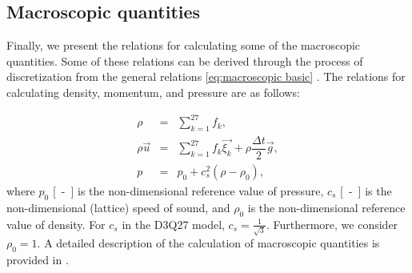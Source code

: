 \subsection{Macroscopic quantities}\label{macro}
Finally, we present the relations for calculating some of the macroscopic quantities. Some of these relations can be derived through the process of discretization from the general relations \eqref{eq:macroscopic basic} \cite{Kruger}. The relations for calculating density, momentum, and pressure are as follows:

\begin{subequations}\label{macroeq}
	\begin{eqnarray}
		\label{rho}
		\rho &=& \sum_{k=1}^{27} f_{k},\\[3pt]
		\rho \vec{u} &=& \sum_{k=1}^{27} f_{k} \vec{\xi_{k}} + \rho \dfrac{\Delta t}{2} \vec{g},\\[3pt]
		p &=& p_0 + c_{s}^{2} (\rho - \rho_0),
	\end{eqnarray}
\end{subequations}
where $ p_0 $ \si{[-]} is the non-dimensional reference value of pressure, $ c_s $ \si{[-]} is the non-dimensional (lattice) speed of sound, and $ \rho_0 $ is the non-dimensional reference value of density. For $ c_s $ in the D3Q27 model, $ c_s = \frac{1}{\sqrt{3}} $. Furthermore, we consider $ \rho_0 = 1 $. A detailed description of the calculation of macroscopic quantities is provided in \cite{Kruger}.